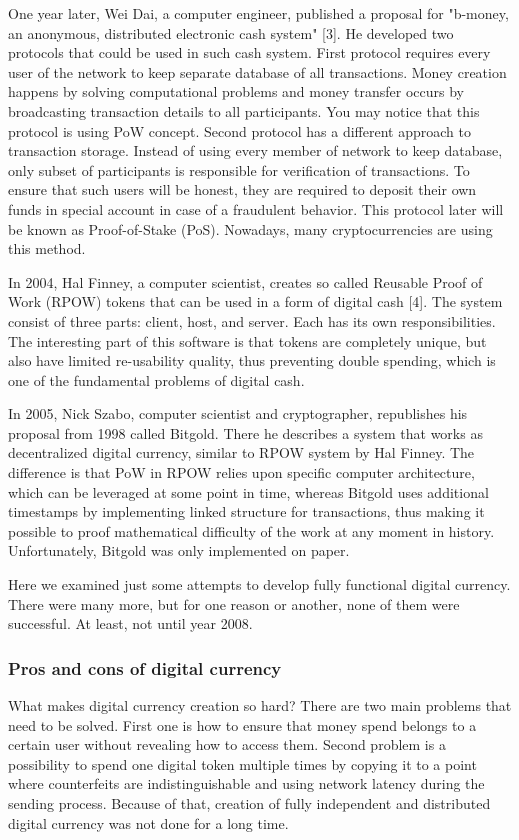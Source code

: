 \documentclass[conference,compsoc]{IEEEtran}
\begin{document}
One year later, Wei Dai, a computer engineer, published a proposal for "b-money, an anonymous, distributed electronic cash system" [3]. He developed two protocols that could be used in such cash system. First protocol requires every user of the network to keep separate database of all transactions. Money creation happens by solving computational problems and money transfer occurs by broadcasting transaction details to all participants. You may notice that this protocol is using PoW concept. Second protocol has a different approach to transaction storage. Instead of using every member of network to keep database, only subset of participants is responsible for verification of transactions. To ensure that such users will be honest, they are required to deposit their own funds in special account in case of a fraudulent behavior. This protocol later will be known as Proof-of-Stake (PoS). Nowadays, many cryptocurrencies are using this method. 

In 2004, Hal Finney, a computer scientist, creates so called Reusable Proof of Work (RPOW) tokens that can be used in a form of digital cash [4]. 
The system consist of three parts: client, host, and server. Each has its own responsibilities. 
The interesting part of this software is that tokens are completely unique, but also have limited re-usability quality, thus preventing double spending, which is one of the fundamental problems of digital cash. 

In 2005, Nick Szabo, computer scientist and cryptographer, republishes his proposal from 1998 called Bitgold. 
There he describes a system that works as decentralized digital currency, similar to RPOW system by Hal Finney. 
The difference is that PoW in RPOW relies upon specific computer architecture, which can be leveraged at some point in time, whereas Bitgold uses additional timestamps by implementing linked structure for transactions, thus making it possible to proof mathematical difficulty of the work at any moment in history. 
Unfortunately, Bitgold was only implemented on paper.

Here we examined just some attempts to develop fully functional digital currency. 
There were many more, but for one reason or another, none of them were successful. 
At least, not until year 2008. 

\subsubsection{Pros and cons of digital currency}
What makes digital currency creation so hard? There are two main problems that need to be solved. 
First one is how to ensure that money spend belongs to a certain user without revealing how to access them. 
Second problem is a possibility to spend one digital token multiple times by copying it to a point where counterfeits are indistinguishable and using network latency during the sending process. 
Because of that, creation of fully independent and distributed digital currency was not done for a long time. 
\end{document}
